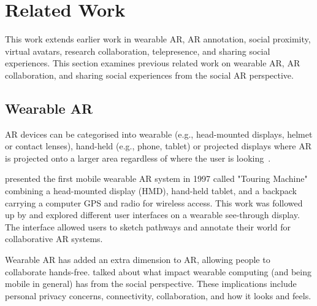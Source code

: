 \chapter{Related Work}
\label{ch:background}



This work extends earlier work in wearable AR, AR annotation, social proximity, virtual avatars, research collaboration, telepresence, and sharing social experiences. This section examines previous related work on wearable AR, AR collaboration, and sharing social experiences from the social AR perspective. 

\section{Wearable AR} 

AR devices can be categorised into wearable (e.g., head-mounted displays, helmet or contact lenses), hand-held (e.g., phone, tablet) or projected displays where AR is projected onto a larger area regardless of where the user is looking~\cite{Peddie2017}. 

\textcite{Feiner1997a} presented the first mobile wearable AR system in 1997 called "Touring Machine" combining a head-mounted display (HMD), hand-held tablet, and a backpack carrying a computer GPS and radio for wireless access. This work was followed up by \textcite{Hollerer1999a} and explored different user interfaces on a wearable see-through display. The interface allowed users to sketch pathways and annotate their world for collaborative AR systems. 

Wearable AR has added an extra dimension to AR, allowing people to collaborate hands-free. \textcite{Feiner1999} talked about what impact wearable computing (and being mobile in general) has from the social perspective. These implications include personal privacy concerns, connectivity, collaboration, and how it looks and feels. 

